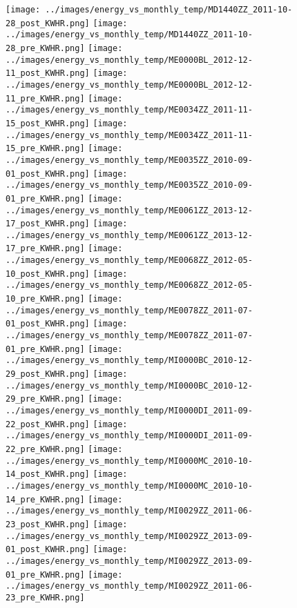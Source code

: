 \clearpage
\begin{figure}
\centering
\texttt{[image: ../images/energy\_vs\_monthly\_temp/MD1440ZZ\_2011-10-28\_post\_KWHR.png]}
\texttt{[image: ../images/energy\_vs\_monthly\_temp/MD1440ZZ\_2011-10-28\_pre\_KWHR.png]}
\texttt{[image: ../images/energy\_vs\_monthly\_temp/ME0000BL\_2012-12-11\_post\_KWHR.png]}
\texttt{[image: ../images/energy\_vs\_monthly\_temp/ME0000BL\_2012-12-11\_pre\_KWHR.png]}
\texttt{[image: ../images/energy\_vs\_monthly\_temp/ME0034ZZ\_2011-11-15\_post\_KWHR.png]}
\texttt{[image: ../images/energy\_vs\_monthly\_temp/ME0034ZZ\_2011-11-15\_pre\_KWHR.png]}
\texttt{[image: ../images/energy\_vs\_monthly\_temp/ME0035ZZ\_2010-09-01\_post\_KWHR.png]}
\texttt{[image: ../images/energy\_vs\_monthly\_temp/ME0035ZZ\_2010-09-01\_pre\_KWHR.png]}
\texttt{[image: ../images/energy\_vs\_monthly\_temp/ME0061ZZ\_2013-12-17\_post\_KWHR.png]}
\texttt{[image: ../images/energy\_vs\_monthly\_temp/ME0061ZZ\_2013-12-17\_pre\_KWHR.png]}
\texttt{[image: ../images/energy\_vs\_monthly\_temp/ME0068ZZ\_2012-05-10\_post\_KWHR.png]}
\texttt{[image: ../images/energy\_vs\_monthly\_temp/ME0068ZZ\_2012-05-10\_pre\_KWHR.png]}
\texttt{[image: ../images/energy\_vs\_monthly\_temp/ME0078ZZ\_2011-07-01\_post\_KWHR.png]}
\texttt{[image: ../images/energy\_vs\_monthly\_temp/ME0078ZZ\_2011-07-01\_pre\_KWHR.png]}
\texttt{[image: ../images/energy\_vs\_monthly\_temp/MI0000BC\_2010-12-29\_post\_KWHR.png]}
\texttt{[image: ../images/energy\_vs\_monthly\_temp/MI0000BC\_2010-12-29\_pre\_KWHR.png]}
\texttt{[image: ../images/energy\_vs\_monthly\_temp/MI0000DI\_2011-09-22\_post\_KWHR.png]}
\texttt{[image: ../images/energy\_vs\_monthly\_temp/MI0000DI\_2011-09-22\_pre\_KWHR.png]}
\texttt{[image: ../images/energy\_vs\_monthly\_temp/MI0000MC\_2010-10-14\_post\_KWHR.png]}
\texttt{[image: ../images/energy\_vs\_monthly\_temp/MI0000MC\_2010-10-14\_pre\_KWHR.png]}
\texttt{[image: ../images/energy\_vs\_monthly\_temp/MI0029ZZ\_2011-06-23\_post\_KWHR.png]}
\texttt{[image: ../images/energy\_vs\_monthly\_temp/MI0029ZZ\_2013-09-01\_post\_KWHR.png]}
\texttt{[image: ../images/energy\_vs\_monthly\_temp/MI0029ZZ\_2013-09-01\_pre\_KWHR.png]}
\texttt{[image: ../images/energy\_vs\_monthly\_temp/MI0029ZZ\_2011-06-23\_pre\_KWHR.png]}
\end{figure}
